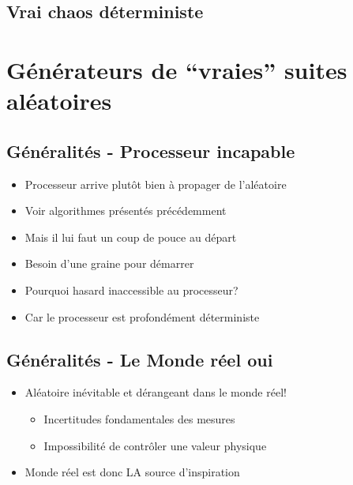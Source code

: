 \documentclass{scrartcl}
\begin{document}
\subsection{Vrai chaos déterministe}

\section{Générateurs de ``vraies'' suites aléatoires}
\subsection{Généralités - Processeur incapable}
 \begin{itemize}
 \item Processeur arrive plutôt bien à propager de l’aléatoire
 \item Voir algorithmes présentés précédemment
 \item Mais il lui faut un coup de pouce au départ
 \item  Besoin d’une graine pour démarrer
 \item Pourquoi hasard inaccessible au processeur?
 \item Car le processeur est profondément déterministe
 \end{itemize}

\subsection{Généralités - Le Monde réel oui}
 \begin{itemize}
 \item Aléatoire inévitable et dérangeant dans le monde réel!
  \begin{itemize}
  \item Incertitudes fondamentales des mesures
  \item Impossibilité de contrôler une valeur physique
  \end{itemize}
 \item Monde réel est donc LA source d’inspiration
 \end{itemize}
\end{document}
